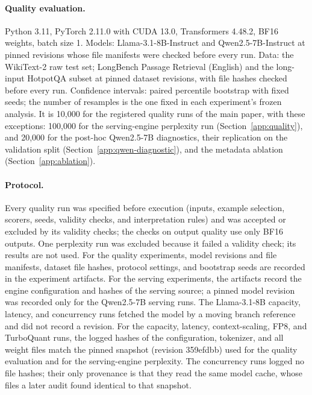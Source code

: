 \documentclass{article}
\begin{document}
\paragraph{Quality evaluation.}
Python 3.11, PyTorch 2.11.0 with CUDA 13.0, Transformers 4.48.2, BF16 weights, batch size 1.
Models: Llama-3.1-8B-Instruct and Qwen2.5-7B-Instruct at pinned revisions whose file manifests were
checked before every run. Data: the WikiText-2 raw test set; LongBench Passage Retrieval (English) and
the long-input HotpotQA subset at pinned dataset revisions, with file hashes checked before every run.
Confidence intervals: paired percentile bootstrap with fixed seeds; the number of resamples is the one
fixed in each experiment's frozen analysis. It is 10,000 for the registered quality runs of the main
paper, with these exceptions: 100,000 for the serving-engine perplexity run
(Section~\ref{app:quality}), and 20,000 for the post-hoc Qwen2.5-7B diagnostics, their replication on
the validation split (Section~\ref{app:qwen-diagnostic}), and the metadata ablation
(Section~\ref{app:ablation}).

\paragraph{Protocol.}
Every quality run was specified before execution (inputs, example selection, scorers, seeds, validity
checks, and interpretation rules) and was accepted or excluded by its validity checks; the checks on
output quality use only BF16 outputs. One perplexity run was excluded because it failed a validity
check; its results are not used. For the quality experiments, model revisions and file manifests,
dataset file hashes, protocol settings, and bootstrap seeds are recorded in the experiment artifacts.
For the serving experiments, the artifacts record the engine configuration and hashes of the serving
source; a pinned model revision was recorded only for the Qwen2.5-7B serving runs. The Llama-3.1-8B capacity,
latency, and concurrency runs fetched the model by a moving branch reference and did not record a
revision. For the capacity, latency, context-scaling, FP8, and TurboQuant runs, the logged hashes of the
configuration, tokenizer, and all weight files match the pinned snapshot (revision 359efdbb) used for
the quality evaluation and for the serving-engine perplexity. The concurrency runs logged no file
hashes; their only provenance is that they read the same model cache, whose files a later audit found
identical to that snapshot.
\end{document}
